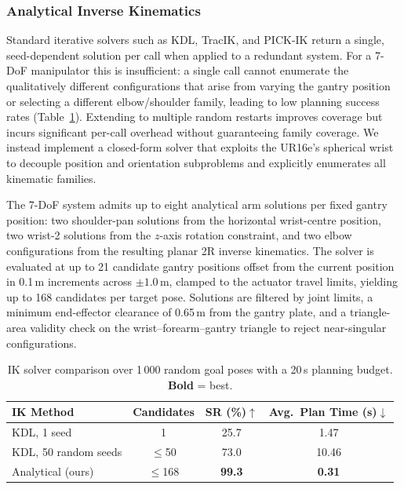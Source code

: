 \documentclass[letterpaper, 10 pt, conference]{ieeeconf}  %
\begin{document}
\subsubsection{Analytical Inverse Kinematics}
Standard iterative solvers such as KDL, TracIK, and PICK-IK return a single,
seed-dependent solution per call when applied to a redundant system.
For a 7-DoF manipulator this is insufficient: a single call cannot enumerate
the qualitatively different configurations that arise from varying the gantry
position or selecting a different elbow/shoulder family, leading to low
planning success rates (Table~\ref{tab:ik_comparison}).
Extending to multiple random restarts improves coverage but incurs significant
per-call overhead without guaranteeing family coverage.
We instead implement a closed-form solver that exploits the UR16e's spherical
wrist to decouple position and orientation subproblems and explicitly
enumerates all kinematic families.

The 7-DoF system admits up to eight analytical arm solutions per fixed gantry
position: two shoulder-pan solutions from the horizontal wrist-centre position,
two wrist-2 solutions from the $z$-axis rotation constraint, and two elbow
configurations from the resulting planar 2R inverse kinematics.
The solver is evaluated at up to 21 candidate gantry positions offset from the
current position in 0.1\,m increments across $\pm1.0$\,m, clamped to the
actuator travel limits, yielding up to 168 candidates per target pose.
Solutions are filtered by joint limits, a minimum end-effector clearance of
0.65\,m from the gantry plate, and a triangle-area validity check on the
wrist--forearm--gantry triangle to reject near-singular configurations.

\begin{table}[!t]
\caption{IK solver comparison over 1\,000 random goal poses with a 20\,s
planning budget. \textbf{Bold} = best.}
\label{tab:ik_comparison}
\centering
\begin{tabular}{l c c c}
\toprule
IK Method & Candidates & SR (\%)$\uparrow$ & Avg.\ Plan Time (s)$\downarrow$ \\
\midrule
KDL, 1 seed            & 1         & 25.7          & 1.47  \\
KDL, 50 random seeds   & $\leq$50  & 73.0          & 10.46 \\
Analytical (ours)      & $\leq$168 & \textbf{99.3} & \textbf{0.31} \\
\bottomrule
\end{tabular}
\end{table}
\end{document}

